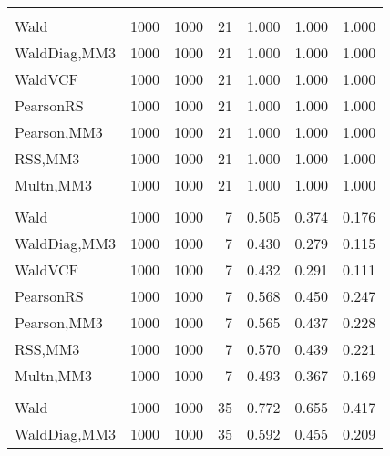 \documentclass[
]{article}
\begin{document}
\begin{table}[H]
{\begin{tabular}[t]{lrrrrrr}
\addlinespace[0.3em]
\multicolumn{7}{l}{\textbf{1F 15V}}\\
\hspace{1em}Wald & 1000 & 1000 & 21 & 1.000 & 1.000 & 1.000\\
\hspace{1em}WaldDiag,MM3 & 1000 & 1000 & 21 & 1.000 & 1.000 & 1.000\\
\hspace{1em}WaldVCF & 1000 & 1000 & 21 & 1.000 & 1.000 & 1.000\\
\hspace{1em}PearsonRS & 1000 & 1000 & 21 & 1.000 & 1.000 & 1.000\\
\hspace{1em}Pearson,MM3 & 1000 & 1000 & 21 & 1.000 & 1.000 & 1.000\\
\hspace{1em}RSS,MM3 & 1000 & 1000 & 21 & 1.000 & 1.000 & 1.000\\
\hspace{1em}Multn,MM3 & 1000 & 1000 & 21 & 1.000 & 1.000 & 1.000\\
\addlinespace[0.3em]
\multicolumn{7}{l}{\textbf{2F 10V}}\\
\hspace{1em}Wald & 1000 & 1000 & 7 & 0.505 & 0.374 & 0.176\\
\hspace{1em}WaldDiag,MM3 & 1000 & 1000 & 7 & 0.430 & 0.279 & 0.115\\
\hspace{1em}WaldVCF & 1000 & 1000 & 7 & 0.432 & 0.291 & 0.111\\
\hspace{1em}PearsonRS & 1000 & 1000 & 7 & 0.568 & 0.450 & 0.247\\
\hspace{1em}Pearson,MM3 & 1000 & 1000 & 7 & 0.565 & 0.437 & 0.228\\
\hspace{1em}RSS,MM3 & 1000 & 1000 & 7 & 0.570 & 0.439 & 0.221\\
\hspace{1em}Multn,MM3 & 1000 & 1000 & 7 & 0.493 & 0.367 & 0.169\\
\addlinespace[0.3em]
\multicolumn{7}{l}{\textbf{3F 15V}}\\
\hspace{1em}Wald & 1000 & 1000 & 35 & 0.772 & 0.655 & 0.417\\
\hspace{1em}WaldDiag,MM3 & 1000 & 1000 & 35 & 0.592 & 0.455 & 0.209\\

\end{tabular}}
\end{table}
\end{document}
